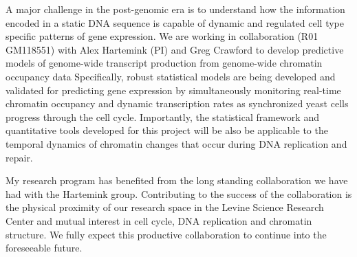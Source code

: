 A major challenge in the post-genomic era is to understand how the information encoded in a static DNA sequence is capable of dynamic and regulated cell type specific patterns of gene expression. We are working in collaboration (R01 GM118551) with Alex Hartemink (PI) and Greg Crawford to develop predictive models of genome-wide transcript production from genome-wide chromatin occupancy data %
Specifically, robust statistical models are being developed and validated for predicting gene expression by simultaneously monitoring real-time chromatin occupancy and dynamic transcription rates as synchronized yeast cells progress through the cell cycle\citep{Orlando2008-jq}.  Importantly, the statistical framework and quantitative tools developed for this project will be also be applicable to the temporal dynamics of chromatin changes that occur during DNA replication and repair.

My research program has benefited from the long standing collaboration we have had with the Hartemink group\citep{MacAlpine2010-ju,Belsky2015-li}.  Contributing to the success of the collaboration is the physical proximity of our research space in the Levine Science Research Center and mutual interest in cell cycle, DNA replication and chromatin structure.  We fully expect this productive collaboration to continue into the foreseeable future. 

\pagebreak




